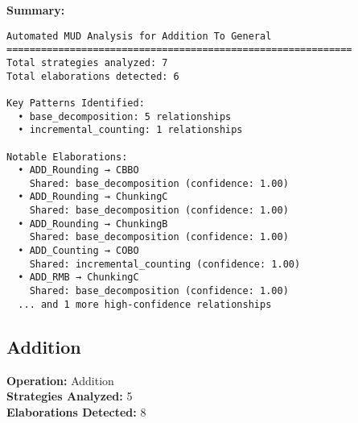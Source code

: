 \documentclass{article}
\begin{document}
\textbf{Summary:}\\
\begin{verbatim}
Automated MUD Analysis for Addition To General
============================================================
Total strategies analyzed: 7
Total elaborations detected: 6

Key Patterns Identified:
  • base_decomposition: 5 relationships
  • incremental_counting: 1 relationships

Notable Elaborations:
  • ADD_Rounding → CBBO
    Shared: base_decomposition (confidence: 1.00)
  • ADD_Rounding → ChunkingC
    Shared: base_decomposition (confidence: 1.00)
  • ADD_Rounding → ChunkingB
    Shared: base_decomposition (confidence: 1.00)
  • ADD_Counting → COBO
    Shared: incremental_counting (confidence: 1.00)
  • ADD_RMB → ChunkingC
    Shared: base_decomposition (confidence: 1.00)
  ... and 1 more high-confidence relationships
\end{verbatim}

\newpage
\subsection{Addition}

\textbf{Operation:} Addition\\
\textbf{Strategies Analyzed:} 5\\
\textbf{Elaborations Detected:} 8\\
\end{document}
